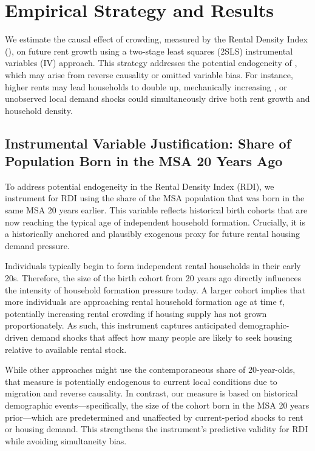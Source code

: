 \documentclass[APA,Times1COL]{WileyNJDv5} %
\begin{document}
\section{Empirical Strategy and Results}

We estimate the causal effect of crowding, measured by the Rental Density Index (), on future rent growth using a two-stage least squares (2SLS) instrumental variables (IV) approach. This strategy addresses the potential endogeneity of , which may arise from reverse causality or omitted variable bias. For instance, higher rents may lead households to double up, mechanically increasing , or unobserved local demand shocks could simultaneously drive both rent growth and household density.

\subsection{Instrumental Variable Justification: Share of Population Born in the MSA 20 Years Ago}
To address potential endogeneity in the Rental Density Index (RDI), we instrument for RDI using the share of the MSA population that was born in the same MSA 20 years earlier. This variable reflects historical birth cohorts that are now reaching the typical age of independent household formation. Crucially, it is a historically anchored and plausibly exogenous proxy for future rental housing demand pressure.

Individuals typically begin to form independent rental households in their early 20s. Therefore, the size of the birth cohort from 20 years ago directly influences the intensity of household formation pressure today. A larger cohort implies that more individuals are approaching rental household formation age at time $t$, potentially increasing rental crowding if housing supply has not grown proportionately. As such, this instrument captures anticipated demographic-driven demand shocks that affect how many people are likely to seek housing relative to available rental stock.

While other approaches might use the contemporaneous share of 20-year-olds, that measure is potentially endogenous to current local conditions due to migration and reverse causality. In contrast, our measure is based on historical demographic events—specifically, the size of the cohort born in the MSA 20 years prior—which are predetermined and unaffected by current-period shocks to rent or housing demand. This strengthens the instrument’s predictive validity for RDI while avoiding simultaneity bias.
\end{document}
